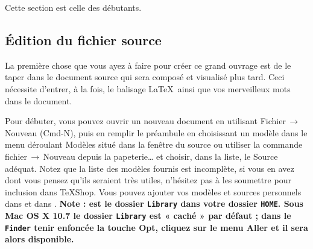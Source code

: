 \documentclass[11pt,french]{article}
\newcommand{\TS}{\textsf{\TeX Shop}}
\newcommand{\cmd}[1]{\textsf{#1}}
\newcommand{\mnu}[1]{\textsf{#1}}
\newcommand{\To}{\,\(\to\)\,}
\begin{document}

Cette section est celle des débutants.


\subsection{Édition du fichier source}

La première chose que vous ayez à faire pour créer ce grand ouvrage est de le taper dans le document source qui sera composé et visualisé plus tard. Ceci nécessite d'entrer, à la fois, le balisage \LaTeX\ ainsi que vos merveilleux mots dans le document.


Pour débuter, vous pouvez ouvrir un nouveau document en utilisant \mnu{Fichier}\To\mnu{Nouveau} \mbox{(\cmd{Cmd-N})}, puis en remplir le préambule en choisissant un modèle dans le menu déroulant \mnu{Modèles} situé dans la fenêtre du source ou utiliser la commande \mnu{fichier}\To\mnu{Nouveau depuis la papeterie…} et choisir, dans la liste, le \mnu{Source} adéquat. Notez que la liste des modèles fournis est incomplète, si vous en avez dont vous pensez qu'ils seraient très utiles, n'hésitez pas à les soumettre pour inclusion dans \TS. Vous pouvez ajouter vos modèles et sources personnels dans  et dans . \textbf {Note :  est le dossier \texttt{Library} dans votre dossier \texttt{HOME}. Sous \textsf{Mac OS X 10.7} le dossier \texttt{Library} est « caché » par défaut ; dans le \texttt{Finder} tenir enfoncée la touche \cmd{Opt}, cliquez sur le menu \mnu{Aller} et il sera alors disponible.}

\end{document}
